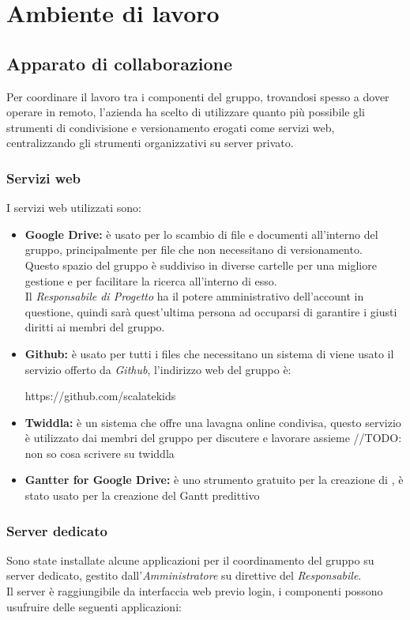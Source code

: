 \documentclass{scalatekids-article}
\begin{document}
\section{Ambiente di lavoro}
\subsection{Apparato di collaborazione}
Per coordinare il lavoro tra i componenti del gruppo, trovandosi spesso a dover
operare in remoto, l'azienda ha scelto di utilizzare quanto più possibile gli
strumenti di condivisione e versionamento erogati come servizi web,
centralizzando gli strumenti organizzativi su server privato.
\subsubsection{Servizi web}
I servizi web utilizzati sono:
\begin{itemize}
\item\textbf{Google Drive:} è usato per lo scambio di file e documenti all'interno del gruppo, principalmente per file che non necessitano di versionamento.\\
Questo spazio del gruppo è suddiviso in diverse cartelle per una migliore gestione e per facilitare la ricerca all'interno di esso.\\
Il \textit{Responsabile di Progetto} ha il potere amministrativo dell'account in questione, quindi sarà quest'ultima persona ad occuparsi di garantire i giusti diritti ai membri del gruppo.
\item\textbf{Github:} è usato per tutti i files che necessitano un sistema di  viene usato il servizio offerto da \textit{Github}, l'indirizzo web del gruppo è:\\
\begin{center}
https://github.com/scalatekids
\end{center}
\item\textbf{Twiddla:} è un sistema che offre una lavagna online condivisa, questo servizio è utilizzato dai membri del gruppo per discutere e lavorare assieme //TODO: non so cosa scrivere su twiddla
\item\textbf{Gantter for Google Drive:} è uno strumento gratuito per la creazione di , è stato usato per la creazione del Gantt predittivo
\end{itemize}
\subsubsection{Server dedicato}
Sono state installate alcune applicazioni per il coordinamento del gruppo su
server dedicato, gestito dall'\textit{Amministratore} su direttive del
\textit{Responsabile}.\\ Il server è raggiungibile da interfaccia web previo
login, i componenti possono usufruire delle seguenti applicazioni:
\end{document}

